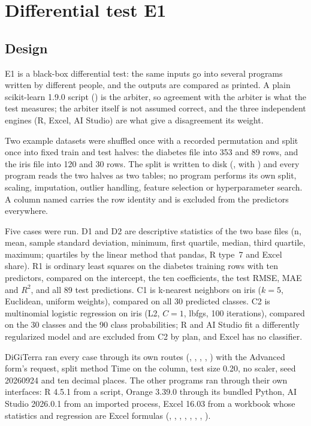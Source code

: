 \section{Differential test E1}
\label{sec:e1}

\subsection{Design}

E1 is a black-box differential test: the same inputs go into several programs written by different people, and the outputs are compared as printed. A plain scikit-learn 1.9.0 script () is the arbiter, so agreement with the arbiter is what the test measures; the arbiter itself is not assumed correct, and the three independent engines (R, Excel, AI Studio) are what give a disagreement its weight.

Two example datasets were shuffled once with a recorded permutation and split once into fixed train and test halves: the diabetes file into 353 and 89 rows, and the iris file into 120 and 30 rows. The split is written to disk (, with ) and every program reads the two halves as two tables; no program performs its own split, scaling, imputation, outlier handling, feature selection or hyperparameter search. A column named  carries the row identity and is excluded from the predictors everywhere.

Five cases were run. D1 and D2 are descriptive statistics of the two base files (n, mean, sample standard deviation, minimum, first quartile, median, third quartile, maximum; quartiles by the linear method that pandas, R type~7 and Excel  share). R1 is ordinary least squares on the diabetes training rows with ten predictors, compared on the intercept, the ten coefficients, the test RMSE, MAE and $R^2$, and all 89 test predictions. C1 is k-nearest neighbors on iris ($k=5$, Euclidean, uniform weights), compared on all 30 predicted classes. C2 is multinomial logistic regression on iris (L2, $C=1$, lbfgs, 100 iterations), compared on the 30 classes and the 90 class probabilities; R and AI Studio fit a differently regularized model and are excluded from C2 by plan, and Excel has no classifier.

DiGiTerra ran every case through its own routes (, , , , ) with the Advanced form's request, split method Time on the  column, test size 0.20, no scaler, seed 20260924 and ten decimal places. The other programs ran through their own interfaces: R 4.5.1 from a script, Orange 3.39.0 through its bundled Python, AI Studio 2026.0.1 from an imported process, Excel 16.03 from a workbook whose statistics and regression are Excel formulas (, , , , , , , ).


